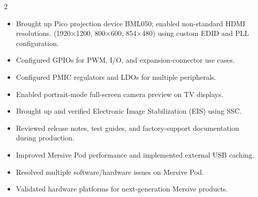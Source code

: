 \documentclass[10pt,a4paper,ragged2e,withhyper]{altacv}
\begin{document}
\begin{paracol}{2}
\begin{itemize}
    \item Brought up Pico projection device BML050; enabled non-standard HDMI resolutions.
    (1920×1200, 800×600, 854×480) using custom EDID and PLL configuration.
    \item Configured GPIOs for PWM, I/O, and expansion-connector use cases.
    \item Configured PMIC regulators and LDOs for multiple peripherals.
    \item Enabled portrait-mode full-screen camera preview on TV displays.
    \item Brought up and verified Electronic Image Stabilization (EIS) using SSC.
    \item Reviewed release notes, test guides, and factory-support documentation during production.
    \item Improved Mersive Pod performance and implemented external USB caching.
    \item Resolved multiple software/hardware issues on Mersive Pod.
    \item Validated hardware platforms for next-generation Mersive products.
\end{itemize}

\end{paracol}
\end{document}
